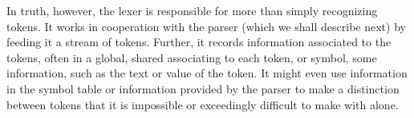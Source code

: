 In truth, however, the lexer is responsible for more than simply recognizing tokens. It works in cooperation with the parser (which we shall describe next) by feeding it a stream of tokens. Further, it records information associated to the tokens, often in a global, shared  associating to each token, or symbol, some information, such as the text or value of the token. It might even use information in the symbol table or information provided by the parser to make a distinction between tokens that it is impossible or exceedingly difficult to make with \regexes alone.

